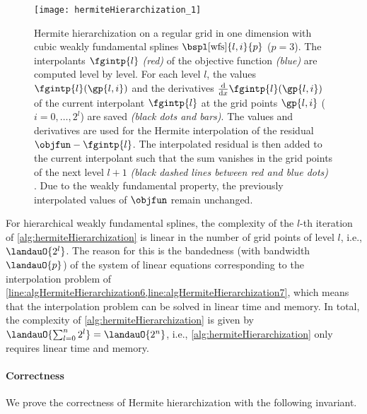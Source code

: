 \begin{SCfigure}
  \texttt{[image: hermiteHierarchization\_1]}%
  \caption[%
    Hermite hierarchization%
  ]{%
    Hermite hierarchization on a regular grid in one dimension
    with cubic weakly fundamental splines $\bspl[\wfs]{l,i}{p}$ ($p = 3$).
    The interpolants $\fgintp{l}$ \emph{\textcolor{C1}{(red)}}
    of the objective function \emph{\textcolor{C0}{(blue)}}
    are computed level by level.
    For each level $l$,
    the values $\fgintp{l}(\gp{l,i})$ and the derivatives
    $\frac{\diff}{\dx} \fgintp{l}(\gp{l,i})$ of the
    current interpolant $\fgintp{l}$ at the
    grid points $\gp{l,i}$ ($i = 0, \dotsc, 2^l$) are saved
    \emph{(black dots and bars)}.
    The values and derivatives are used for the Hermite interpolation
    of the residual $\objfun - \fgintp{l}$.
    The interpolated residual is then added to the current interpolant
    such that the sum vanishes in the grid points of the next level $l + 1$
    \emph{%
      (black dashed lines between \textcolor{C1}{red} and
      \textcolor{C0}{blue} dots)%
    }.
    Due to the weakly fundamental property, the previously
    interpolated values of $\objfun$ remain unchanged.%
  }%
  \label{fig:hermiteHierarchization}%
\end{SCfigure}

For hierarchical weakly fundamental splines,
the complexity of the $l$-th iteration of \cref{alg:hermiteHierarchization}
is linear in the number of grid points of level $l$, i.e., $\landauO{2^l}$.
The reason for this is the bandedness (with bandwidth $\landauO{p}$) of the
system of linear equations corresponding to the interpolation problem of
\cref{line:algHermiteHierarchization6,line:algHermiteHierarchization7},
which means that the interpolation problem can be solved in
linear time and memory.
In total, the complexity of \cref{alg:hermiteHierarchization} is
given by $\landauO{\sum_{l=0}^n 2^l} = \landauO{2^n}$, i.e.,
\cref{alg:hermiteHierarchization} only requires linear time and memory.

\paragraph{Correctness}

We prove the correctness of Hermite hierarchization
with the following invariant.

